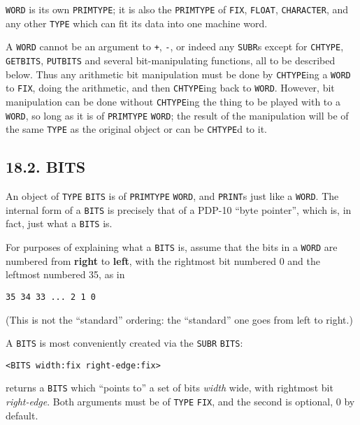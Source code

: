 \documentclass[a4paper,]{article}
\begin{document}
\texttt{WORD} is its own \texttt{PRIMTYPE}; it is also the \texttt{PRIMTYPE} of \texttt{FIX}, \texttt{FLOAT},
\texttt{CHARACTER}, and any other \texttt{TYPE} which can fit its data into one machine word.

A \texttt{WORD} cannot be an argument to \texttt{+}, \texttt{-}, or indeed any \texttt{SUBR}s except for \texttt{CHTYPE},
\texttt{GETBITS}, \texttt{PUTBITS} and several bit-manipulating functions, all to be described below. Thus any arithmetic
bit manipulation must be done by \texttt{CHTYPE}ing a \texttt{WORD} to \texttt{FIX}, doing the arithmetic, and then
\texttt{CHTYPE}ing back to \texttt{WORD}. However, bit manipulation can be done without \texttt{CHTYPE}ing the thing to be
played with to a \texttt{WORD}, so long as it is of \texttt{PRIMTYPE} \texttt{WORD}; the result of the manipulation will be
of the same \texttt{TYPE} as the original object or can be \texttt{CHTYPE}d to it.

\subsection{18.2. BITS}\label{bits}

 An object of \texttt{TYPE} \texttt{BITS} is of \texttt{PRIMTYPE} \texttt{WORD}, and
\texttt{PRINT}s just like a \texttt{WORD}. The internal form of a \texttt{BITS} is precisely that of a PDP-10 ``byte
pointer'', which is, in fact, just what a \texttt{BITS} is.

For purposes of explaining what a \texttt{BITS} is, assume that the bits in a \texttt{WORD} are numbered from
\textbf{right} to \textbf{left}, with the rightmost bit numbered 0 and the leftmost numbered 35, as in

\begin{verbatim}
35 34 33 ... 2 1 0
\end{verbatim}

(This is not the ``standard'' ordering: the ``standard'' one goes from left to right.)

A \texttt{BITS} is most conveniently created via the \texttt{SUBR} \texttt{BITS}:

\begin{verbatim}
<BITS width:fix right-edge:fix>
\end{verbatim}

returns a \texttt{BITS} which ``points to'' a set of bits \emph{width} wide, with rightmost bit \emph{right-edge}. Both
arguments must be of \texttt{TYPE} \texttt{FIX}, and the second is optional, 0 by default.
\end{document}
